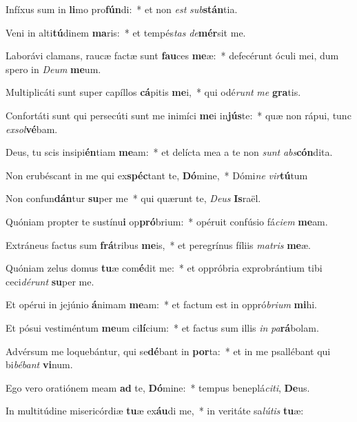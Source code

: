 \item Infíxus sum in \textbf{li}mo pro\textbf{fún}di:~* et non \textit{est} \textit{sub}\textbf{stán}tia.
\item Veni in alti\textbf{tú}dinem \textbf{ma}ris:~* et tempés\textit{tas} \textit{de}\textbf{mér}sit me.
\item Laborávi clamans, raucæ factæ sunt \textbf{fau}ces \textbf{me}æ:~* defecérunt óculi mei, dum spero in \textit{De}\textit{um} \textbf{me}um.
\item Multiplicáti sunt super capíllos \textbf{cá}pitis \textbf{me}i,~* qui odé\textit{runt} \textit{me} \textbf{gra}tis.
\item Confortáti sunt qui persecúti sunt me inimíci \textbf{me}i in\textbf{jús}te:~* quæ non rápui, tunc \textit{ex}\textit{sol}\textbf{vé}bam.
\item Deus, tu scis insipi\textbf{én}tiam \textbf{me}am:~* et delícta mea a te non \textit{sunt} \textit{abs}\textbf{cón}dita.
\item Non erubéscant in me qui ex\textbf{spéc}tant te, \textbf{Dó}mine,~* Dómi\textit{ne} \textit{vir}\textbf{tú}tum
\item Non confun\textbf{dán}tur \textbf{su}per me~* qui quærunt te, \textit{De}\textit{us} \textbf{Is}raël.
\item Quóniam propter te sustínu\textbf{i} op\textbf{pró}brium:~* opéruit confúsio fá\textit{ci}\textit{em} \textbf{me}am.
\item Extráneus factus sum \textbf{frá}tribus \textbf{me}is,~* et peregrínus fíliis \textit{ma}\textit{tris} \textbf{me}æ.
\item Quóniam zelus domus \textbf{tu}æ com\textbf{é}dit me:~* et oppróbria exprobrántium tibi ceci\textit{dé}\textit{runt} \textbf{su}per me.
\item Et opérui in jejúnio \textbf{á}nimam \textbf{me}am:~* et factum est in oppró\textit{bri}\textit{um} \textbf{mi}hi.
\item Et pósui vestiméntum \textbf{me}um ci\textbf{lí}cium:~* et factus sum illis \textit{in} \textit{pa}\textbf{rá}bolam.
\item Advérsum me loquebántur, qui se\textbf{dé}bant in \textbf{por}ta:~* et in me psallébant qui bi\textit{bé}\textit{bant} \textbf{vi}num.
\item Ego vero oratiónem meam \textbf{ad} te, \textbf{Dó}mine:~* tempus beneplá\textit{ci}\textit{ti}, \textbf{De}us.
\item In multitúdine misericórdiæ \textbf{tu}æ ex\textbf{áu}di me,~* in veritáte sa\textit{lú}\textit{tis} \textbf{tu}æ:
